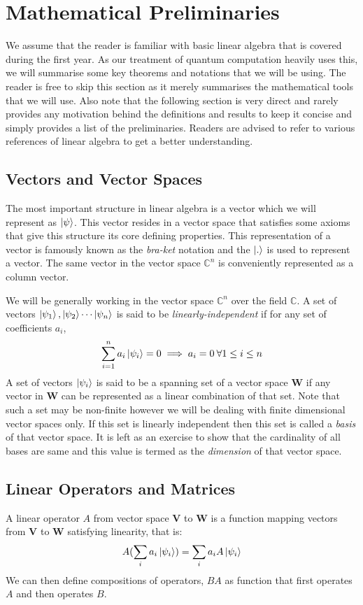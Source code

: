 \chapter{Mathematical Preliminaries}

We assume that the reader is familiar with basic linear algebra that is covered during the first year. As our treatment of quantum computation heavily uses this, we will summarise some key theorems and notations that we will be using. The reader is free to skip this section as it merely summarises the mathematical tools that we will use. Also note that the following section is very direct and rarely provides any motivation behind the definitions and results to keep it concise and simply provides a list of the preliminaries. Readers are advised to refer to various references of linear algebra to get a better understanding.

\section{Vectors and Vector Spaces}
The most important structure in linear algebra is a vector which we will represent as $\ket{\psi}$. This vector resides in a vector space that satisfies some axioms that give this structure its core defining properties. This representation of a vector is famously known as the \textit{bra-ket} notation and the $\ket{.}$ is used to represent a vector. The same vector in the vector space $\mathbb{C}^{n}$ is conveniently represented as a column vector.

We will be generally working in the vector space $\mathbb{C}^{n}$ over the field $\mathbb{C}$.
A set of vectors $\ket{\psi_{1}}, \ket{\psi_{2}} \cdots \ket{\psi_{n}}$ is said to be \textit{linearly-independent} if for any set of coefficients ${a_i}$, 
$$\sum_{i=1}^{n} a_i\ket{\psi_{i}} = 0 \implies a_i = 0 \:  \forall   1 \leq i \leq n$$
A set of vectors ${\ket{\psi_{i}}}$ is said to be a spanning set of a vector space $\textbf{W}$ if any vector in $\textbf{W}$ can be represented as a linear combination of that set. Note that such a set may be non-finite however we will be dealing with finite dimensional vector spaces only. If this set is linearly independent then this set is called a \textit{basis} of that vector space. It is left as an exercise to show that the cardinality of all bases are same and this value is termed as the \textit{dimension} of that vector space.

\section{Linear Operators and Matrices}
A linear operator $A$ from vector space \textbf{V} to \textbf{W} is a function mapping vectors from \textbf{V} to \textbf{W} satisfying linearity, that is:
$$ A(\sum_{i} a_i \ket{\psi_{i}}) = \sum_{i} a_{i}A\ket{\psi_{i}} $$ 
We can then define compositions of operators, $BA$ as function that first operates $A$ and then operates $B$. 

